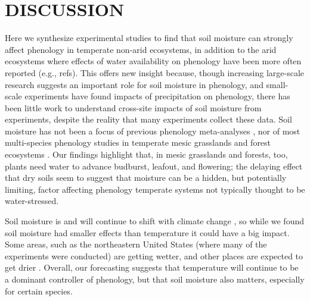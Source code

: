 \documentclass{article}
\begin{document}

\section* {DISCUSSION}
\par Here we synthesize experimental studies to find that soil moisture can strongly affect phenology in temperate non-arid ecosystems, in addition to the arid ecosystems where effects of water availability on phenology have been more often reported (e.g., refs). This offers new insight because, though increasing large-scale research suggests an important role for soil moisture in phenology, and small-scale experiments have found impacts of precipitation on phenology, there has been little work to understand cross-site impacts of soil moisture from experiments, despite the reality that many experiments collect these data. Soil moisture has not been a focus of previous phenology meta-analyses \cite[e.g.,][]{wolkovich2012}, nor of most multi-species phenology studies in temperate mesic grasslands and forest ecosystems \cite[e.g.,][]{Vitass2021}. Our findings highlight that, in mesic grasslands and forests, too, plants need water to advance budburst, leafout, and flowering; the delaying effect that dry soils seem to suggest that moisture can be a hidden, but potentially limiting, factor affecting phenology temperate systems not typically thought to be water-stressed. 

\par Soil moisture is and will continue to shift with climate change \citep{berg2017}, so while we found soil moisture had smaller effects than temperature it could have a big impact. Some areas, such as the northeastern United States (where many of the experiments were conducted) are getting wetter, and other places are expected to get drier \citep{berg2017}. Overall, our forecasting suggests that temperature will continue to be a dominant controller of phenology, but that soil moisture also matters, especially for certain species. 
\end{document}
